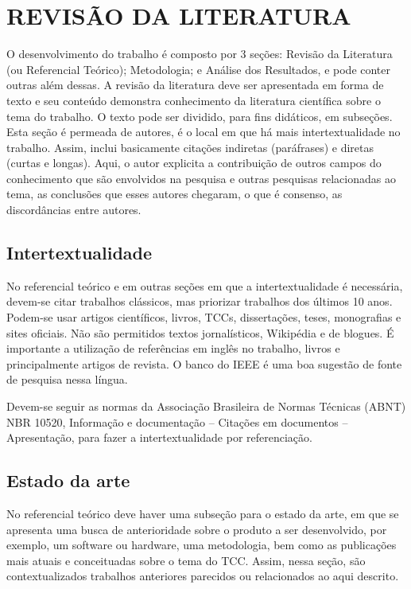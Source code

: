 \chapter{REVISÃO DA LITERATURA}\label{chp:REVISAO}

O desenvolvimento do trabalho é composto por 3 seções: Revisão da Literatura (ou Referencial Teórico); Metodologia; e Análise dos Resultados, e pode conter outras além dessas. A revisão da literatura deve ser apresentada em forma de texto e seu conteúdo demonstra conhecimento da literatura científica sobre o tema do trabalho. O texto pode ser dividido, para fins didáticos, em subseções. Esta seção é permeada de autores, é o local em que há mais intertextualidade no trabalho. Assim, inclui basicamente citações indiretas (paráfrases) e diretas (curtas e longas). Aqui, o autor explicita a contribuição de outros campos do conhecimento que são envolvidos na pesquisa e outras pesquisas relacionadas ao tema, as conclusões que esses autores chegaram, o que é consenso, as discordâncias entre autores. 


\section{Intertextualidade}\label{sec:INTERTEXTUALIDADE}
No referencial teórico e em outras seções em que a intertextualidade é necessária, devem-se citar trabalhos clássicos, mas priorizar trabalhos dos últimos 10 anos. Podem-se usar artigos científicos, livros, TCCs, dissertações, teses, monografias e sites oficiais. Não são permitidos textos jornalísticos, Wikipédia e de blogues. É importante a utilização de referências em inglês no trabalho, livros e principalmente artigos de revista. O banco do IEEE é uma boa sugestão de fonte de pesquisa nessa língua. 

Devem-se seguir as normas da Associação Brasileira de Normas Técnicas (ABNT)  NBR 10520, Informação e documentação – Citações em documentos – Apresentação,  para fazer a intertextualidade por referenciação. 

\section{Estado da arte}\label{sec:ESTADOARTE}

No referencial teórico deve haver uma subseção para o estado da arte, em que se apresenta uma busca de anterioridade sobre o produto a ser desenvolvido, por exemplo, um software ou hardware, uma metodologia, bem como as publicações mais atuais e conceituadas sobre o tema do TCC. Assim, nessa seção, são contextualizados trabalhos anteriores parecidos ou relacionados ao aqui descrito. 

